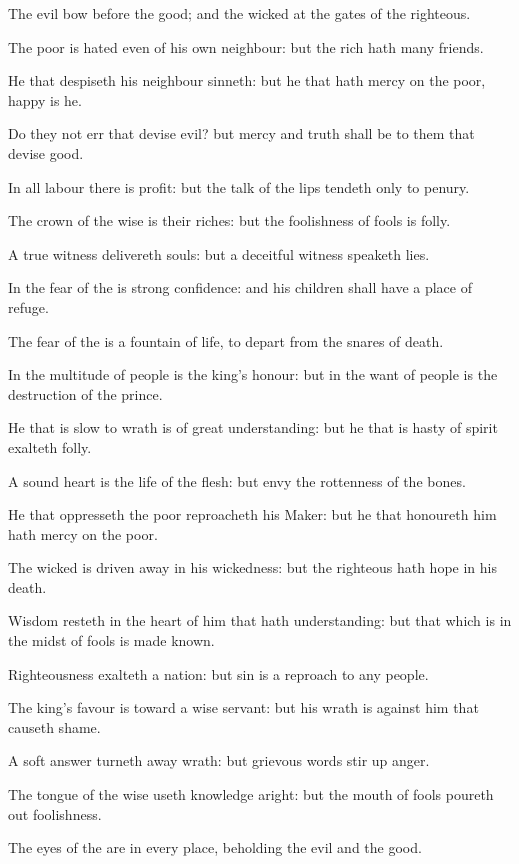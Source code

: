 \Verse The evil bow before the good; and the wicked at the gates of the righteous.

\Verse The poor is hated even of his own neighbour: but the rich hath many friends.

\Verse He that despiseth his neighbour sinneth: but he that hath mercy on the poor, happy is he.

\Verse Do they not err that devise evil? but mercy and truth shall be to them that devise good.

\Verse In all labour there is profit: but the talk of the lips tendeth only to penury.

\Verse The crown of the wise is their riches: but the foolishness of fools is folly.

\Verse A true witness delivereth souls: but a deceitful witness speaketh lies.

\Verse In the fear of the \LORD is strong confidence: and his children shall have a place of refuge.

\Verse The fear of the \LORD is a fountain of life, to depart from the snares of death.

\Verse In the multitude of people is the king's honour: but in the want of people is the destruction of the prince.

\Verse He that is slow to wrath is of great understanding: but he that is hasty of spirit exalteth folly.

\Verse A sound heart is the life of the flesh: but envy the rottenness of the bones.

\Verse He that oppresseth the poor reproacheth his Maker: but he that honoureth him hath mercy on the poor.

\Verse The wicked is driven away in his wickedness: but the righteous hath hope in his death.

\Verse Wisdom resteth in the heart of him that hath understanding: but that which is in the midst of fools is made known.

\Verse Righteousness exalteth a nation: but sin is a reproach to any people.

\Verse The king's favour is toward a wise servant: but his wrath is against him that causeth shame.


\Chapter
\Verse A soft answer turneth away wrath: but grievous words stir up anger.

\Verse The tongue of the wise useth knowledge aright: but the mouth of fools poureth out foolishness.

\Verse The eyes of the \LORD are in every place, beholding the evil and the good.

